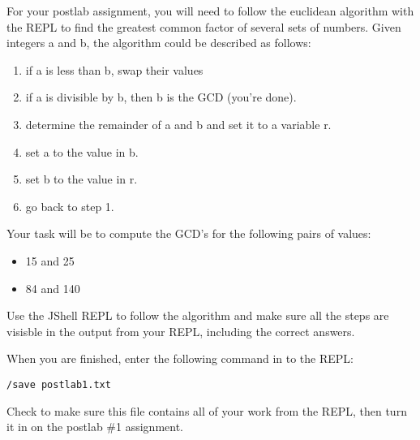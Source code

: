 
For your postlab assignment, you will need to follow the euclidean algorithm with 
the REPL to find the greatest common factor of several sets of numbers. Given 
integers a and b, the algorithm could be described as follows:

\begin{enumerate}
\item if a is less than b, swap their values
\item if a is divisible by b, then b is the GCD (you're done). 
\item determine the remainder of a and b and set it to a variable r.
\item set a to the value in b.
\item set b to the value in r.
\item go back to step 1.
\end{enumerate}

Your task will be to compute the GCD's for the following pairs of values:
\begin{itemize}
\item 15 and 25
\item 84 and 140
\end{itemize}

Use the JShell REPL to follow the algorithm and make sure all the steps are visisble in the output from your REPL, including the correct answers. 

When you are finished, enter the following command in to the REPL:

\begin{verbatim}
/save postlab1.txt
\end{verbatim}

Check to make sure this file contains all of your work from the REPL, then 
turn it in on the postlab \#1 assignment. 